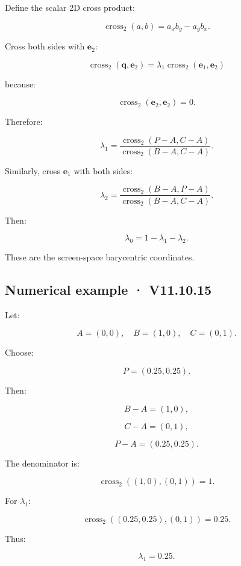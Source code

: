 \hypertarget{02-foundations-ii-ch034-derive-the-determinant-form}{}

Define the scalar 2D cross product:

\[
 \boxed{ \operatorname{cross}_2(a,b)=a_xb_y-a_yb_x }.
\]

Cross both sides with \(\mathbf e_2\):

\[
 \operatorname{cross}_2(\mathbf q,\mathbf e_2) = \lambda_1 \operatorname{cross}_2(\mathbf e_1,\mathbf e_2)
\]

because:

\[
 \operatorname{cross}_2(\mathbf e_2,\mathbf e_2)=0.
\]

Therefore:

\[
 \boxed{ \lambda_1= \frac{ \operatorname{cross}_2(P-A,C-A) }{ \operatorname{cross}_2(B-A,C-A) } }.
\]

Similarly, cross \(\mathbf e_1\) with both sides:

\[
 \boxed{ \lambda_2= \frac{ \operatorname{cross}_2(B-A,P-A) }{ \operatorname{cross}_2(B-A,C-A) } }.
\]

Then:

\[
 \boxed{ \lambda_0=1-\lambda_1-\lambda_2 }.
\]

These are the screen-space barycentric coordinates.

\subsection{Numerical example · V11.10.15}\label{02-foundations-ii-ch034-numerical-example-v11.10.15}

\hypertarget{02-foundations-ii-ch034-numerical-example-v11.10.15}{}

Let:

\[
 A=(0,0),\quad B=(1,0),\quad C=(0,1).
\]

Choose:

\[
 P=(0.25,0.25).
\]

Then:

\[
 B-A=(1,0),
\]

\[
 C-A=(0,1),
\]

\[
 P-A=(0.25,0.25).
\]

The denominator is:

\[
 \operatorname{cross}_2((1,0),(0,1))=1.
\]

For \(\lambda_1\):

\[
 \operatorname{cross}_2((0.25,0.25),(0,1))=0.25.
\]

Thus:

\[
 \lambda_1=0.25.
\]

